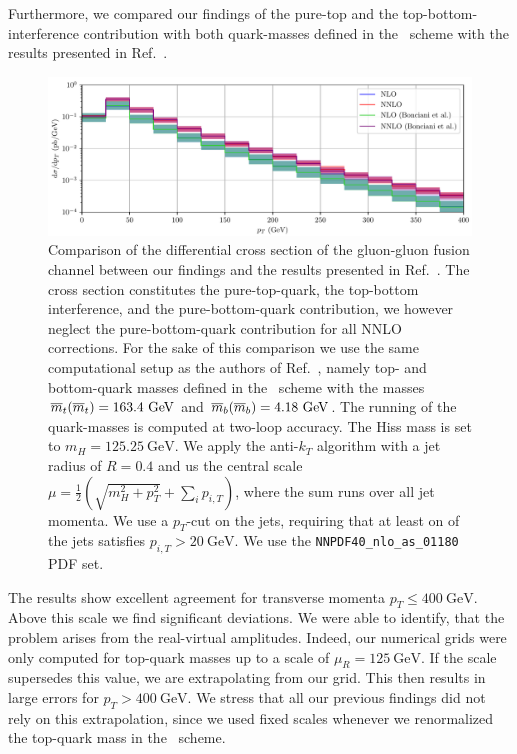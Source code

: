 Furthermore, we compared our findings of the pure-top and the top-bottom-interference contribution with both quark-masses defined in the \MS\ scheme with the results presented in Ref.~\cite{Bonciani:2022jmb}.
\begin{figure}[h]
\centering
\includegraphics[width=\textwidth]{Images/pTBonciani.pdf}
\caption{Comparison of the differential cross section of the gluon-gluon fusion channel between our findings and the results presented in Ref.~\cite{Bonciani:2022jmb}. The cross section constitutes the pure-top-quark, the top-bottom interference, and the pure-bottom-quark contribution, we however neglect the pure-bottom-quark contribution for all \acs{NNLO} corrections. For the sake of this comparison we use the same computational setup as the authors of Ref.~\cite{Bonciani:2022jmb}, namely top- and bottom-quark masses defined in the \MS\ scheme with the masses $\msMass{t} = 163.4\ \mathrm{GeV}$ and $\msMass{b} = 4.18\ \mathrm{GeV}$. The running of the quark-masses is computed at two-loop accuracy. The Hiss mass is set to $m_H = 125.25\ \mathrm{GeV}$. We apply the anti-$k_T$ algorithm with a jet radius of $R = 0.4$ and us the central scale $\mu = \frac{1}{2}\left( \sqrt{m_H^2 + p_T^2} + \sum_i p_{i, T} \right)$, where the sum runs over all jet momenta. We use a $p_T$-cut on the jets, requiring that at least on of the jets satisfies $p_{i,T} > 20 \ \mathrm{GeV}$. We use the \texttt{NNPDF40\_nlo\_as\_01180} \acs{PDF} set.}
\label{fig:6:bonciani_comparison}
\end{figure}
The results show excellent agreement for transverse momenta $p_T \le 400 \ \mathrm{GeV}$. Above this scale we find significant deviations. We were able to identify, that the problem arises from the real-virtual amplitudes. Indeed, our numerical grids were only computed for top-quark masses up to a scale of $\mu_R = 125\ \mathrm{GeV}$. If the scale supersedes this value, we are extrapolating from our grid. This then results in large errors for $p_T > 400 \ \mathrm{GeV}$. We stress that all our previous findings did not rely on this extrapolation, since we used fixed scales whenever we renormalized the top-quark mass in the \MS\ scheme.

